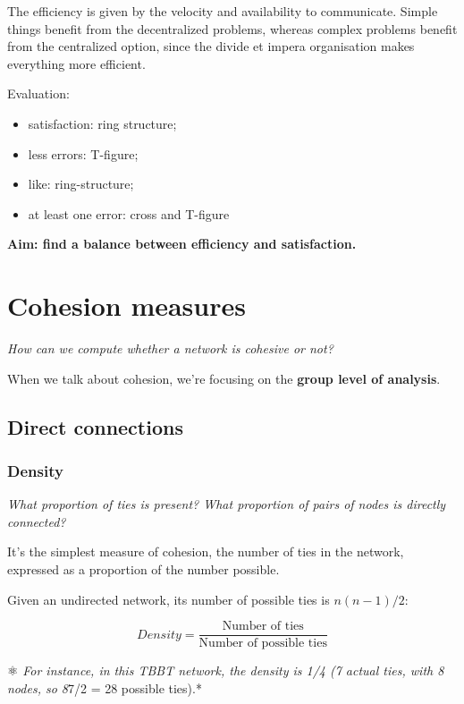\documentclass[
  notitlepage,
  onecolumn,
  openany]{book}
\providecommand{\tightlist}{%
  \setlength{\itemsep}{0pt}\setlength{\parskip}{0pt}}
\begin{document}
The efficiency is given by the velocity and availability to communicate. Simple things benefit from the decentralized problems, whereas complex problems benefit from the centralized option, since the divide et impera organisation makes everything more efficient.

Evaluation:

\begin{itemize}
\tightlist
\item
  satisfaction: ring structure;
\item
  less errors: T-figure;
\item
  like: ring-structure;
\item
  at least one error: cross and T-figure
\end{itemize}

\textbf{Aim: find a balance between efficiency and satisfaction.}

\hypertarget{cohesion-measures}{%
\chapter{Cohesion measures}\label{cohesion-measures}}

\emph{How can we compute whether a network is cohesive or not?}

When we talk about cohesion, we're focusing on the \textbf{group level of analysis}.

\hypertarget{direct-connections}{%
\section{Direct connections}\label{direct-connections}}

\hypertarget{density}{%
\subsection{Density}\label{density}}

\emph{What proportion of ties is present? What proportion of pairs of nodes is directly connected?}

It's the simplest measure of cohesion, the number of ties in the network, expressed as a proportion of the number possible.

Given an undirected network, its number of possible ties is \(n(n-1)/2\):

\[
Density = \frac{\text{Number of ties}}{\text{Number of possible ties}}
\]

⚛️ \emph{For instance, in this TBBT network, the density is 1/4 (7 actual ties, with 8 nodes, so 8}7/2 = 28 possible ties).*
\end{document}
